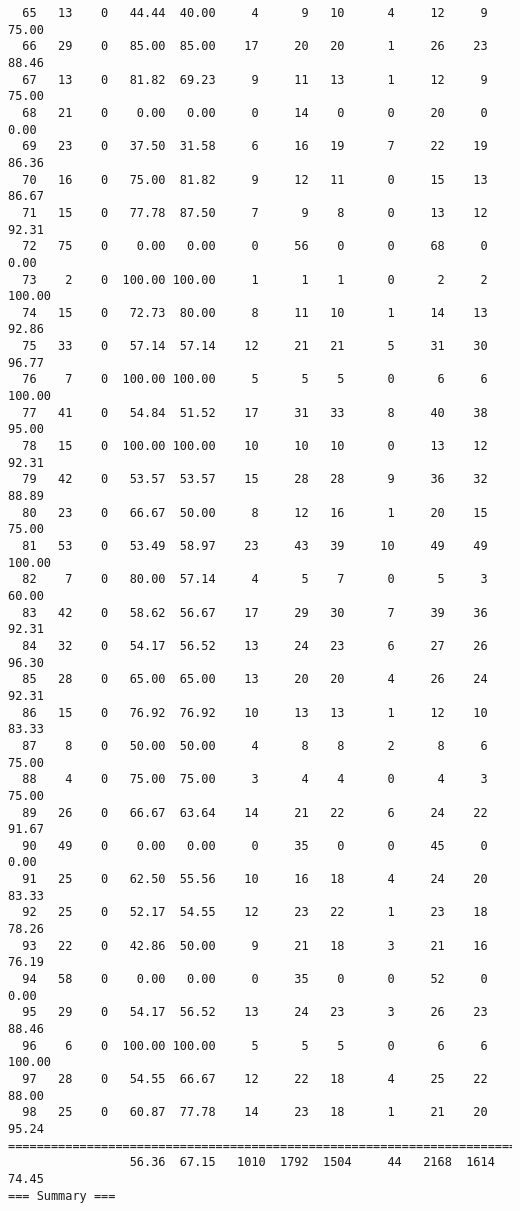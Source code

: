 \begin{verbatim}
  65   13    0   44.44  40.00     4      9   10      4     12     9    75.00
  66   29    0   85.00  85.00    17     20   20      1     26    23    88.46
  67   13    0   81.82  69.23     9     11   13      1     12     9    75.00
  68   21    0    0.00   0.00     0     14    0      0     20     0     0.00
  69   23    0   37.50  31.58     6     16   19      7     22    19    86.36
  70   16    0   75.00  81.82     9     12   11      0     15    13    86.67
  71   15    0   77.78  87.50     7      9    8      0     13    12    92.31
  72   75    0    0.00   0.00     0     56    0      0     68     0     0.00
  73    2    0  100.00 100.00     1      1    1      0      2     2   100.00
  74   15    0   72.73  80.00     8     11   10      1     14    13    92.86
  75   33    0   57.14  57.14    12     21   21      5     31    30    96.77
  76    7    0  100.00 100.00     5      5    5      0      6     6   100.00
  77   41    0   54.84  51.52    17     31   33      8     40    38    95.00
  78   15    0  100.00 100.00    10     10   10      0     13    12    92.31
  79   42    0   53.57  53.57    15     28   28      9     36    32    88.89
  80   23    0   66.67  50.00     8     12   16      1     20    15    75.00
  81   53    0   53.49  58.97    23     43   39     10     49    49   100.00
  82    7    0   80.00  57.14     4      5    7      0      5     3    60.00
  83   42    0   58.62  56.67    17     29   30      7     39    36    92.31
  84   32    0   54.17  56.52    13     24   23      6     27    26    96.30
  85   28    0   65.00  65.00    13     20   20      4     26    24    92.31
  86   15    0   76.92  76.92    10     13   13      1     12    10    83.33
  87    8    0   50.00  50.00     4      8    8      2      8     6    75.00
  88    4    0   75.00  75.00     3      4    4      0      4     3    75.00
  89   26    0   66.67  63.64    14     21   22      6     24    22    91.67
  90   49    0    0.00   0.00     0     35    0      0     45     0     0.00
  91   25    0   62.50  55.56    10     16   18      4     24    20    83.33
  92   25    0   52.17  54.55    12     23   22      1     23    18    78.26
  93   22    0   42.86  50.00     9     21   18      3     21    16    76.19
  94   58    0    0.00   0.00     0     35    0      0     52     0     0.00
  95   29    0   54.17  56.52    13     24   23      3     26    23    88.46
  96    6    0  100.00 100.00     5      5    5      0      6     6   100.00
  97   28    0   54.55  66.67    12     22   18      4     25    22    88.00
  98   25    0   60.87  77.78    14     23   18      1     21    20    95.24
============================================================================
                 56.36  67.15   1010  1792  1504     44   2168  1614    74.45
=== Summary ===


\end{verbatim}
